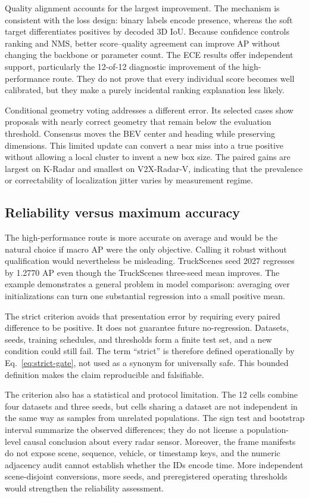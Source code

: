 \documentclass[preprint,12pt,times]{elsarticle}
\begin{document}
Quality alignment accounts for the largest improvement. The mechanism is
consistent with the loss design: binary labels encode presence, whereas the
soft target differentiates positives by decoded 3D IoU. Because confidence
controls ranking and NMS, better score--quality agreement can improve AP
without changing the backbone or parameter count. The ECE results offer
independent support, particularly the 12-of-12 diagnostic improvement of the
high-performance route. They do not prove that every individual score becomes
well calibrated, but they make a purely incidental ranking explanation less
likely.

Conditional geometry voting addresses a different error. Its selected cases show proposals
with nearly correct geometry that remain below the evaluation threshold.
Consensus moves the BEV center and heading while preserving dimensions. This
limited update can convert a near miss into a true positive without allowing a
local cluster to invent a new box size. The paired gains are largest on
K-Radar and smallest on V2X-Radar-V, indicating that the prevalence or
correctability of localization jitter varies by measurement regime.

\subsection{Reliability versus maximum accuracy}

The high-performance route is more accurate on average and would be the natural
choice if macro AP were the only objective. Calling it robust without
qualification would nevertheless be misleading. TruckScenes seed 2027
regresses by 1.2770 AP even though the TruckScenes three-seed mean improves.
The example demonstrates a general problem in model comparison: averaging
over initializations can turn one substantial regression into a small positive
mean.

The strict criterion avoids that presentation error by requiring every paired
difference to be positive. It does not guarantee future no-regression.
Datasets, seeds, training schedules, and thresholds form a finite test set,
and a new condition could still fail. The term ``strict'' is therefore defined
operationally by Eq.~\eqref{eq:strict-gate}, not used as a synonym for
universally safe. This bounded definition makes the claim reproducible and
falsifiable.

The criterion also has a statistical and protocol limitation. The 12 cells combine four
datasets and three seeds, but cells sharing a dataset are not independent in
the same way as samples from unrelated populations. The sign test and
bootstrap interval summarize the observed differences; they do not license a
population-level causal conclusion about every radar sensor. Moreover, the
frame manifests do not expose scene, sequence, vehicle, or timestamp keys, and
the numeric adjacency audit cannot establish whether the IDs encode time. More
independent scene-disjoint conversions, more seeds, and preregistered operating
thresholds would strengthen the reliability assessment.
\end{document}
